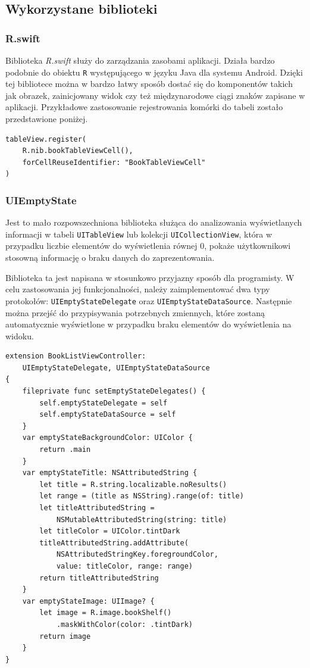 \documentclass[twoside]{projektInzynierskiMS}
\begin{document}
\subsection{Wykorzystane biblioteki}

\subsubsection{R.swift}

Biblioteka \textit{R.swift} służy do zarządzania zasobami aplikacji. Działa bardzo podobnie do obiektu \verb`R` występującego w języku Java dla systemu Android. Dzięki tej bibliotece można w bardzo łatwy sposób dostać się do komponentów takich jak obrazek, zainicjowany widok czy też międzynarodowe ciągi znaków zapisane w aplikacji. Przykładowe zastosowanie rejestrowania komórki do tabeli zostało przedstawione poniżej.
\begin{verbatim}
tableView.register(
    R.nib.bookTableViewCell(),
    forCellReuseIdentifier: "BookTableViewCell"
)
\end{verbatim}


\subsubsection{UIEmptyState}

Jest to mało rozpowszechniona biblioteka służąca do analizowania wyświetlanych informacji w tabeli \verb`UITableView` lub kolekcji \verb`UICollectionView`, która w przypadku liczbie elementów do wyświetlenia równej 0, pokaże użytkownikowi stosowną informację o braku danych do zaprezentowania.

Biblioteka ta jest napisana w stosunkowo przyjazny sposób dla programisty. W celu zastosowania jej funkcjonalności, należy zaimplementować dwa typy protokołów: \verb`UIEmptyStateDelegate` oraz \verb`UIEmptyStateDataSource`. Następnie można przejść do przypisywania potrzebnych zmiennych, które zostaną automatycznie wyświetlone w przypadku braku elementów do wyświetlenia na widoku.
\begin{verbatim}
extension BookListViewController:
    UIEmptyStateDelegate, UIEmptyStateDataSource
{
    fileprivate func setEmptyStateDelegates() {
        self.emptyStateDelegate = self
        self.emptyStateDataSource = self
    }
    var emptyStateBackgroundColor: UIColor {
        return .main
    }
    var emptyStateTitle: NSAttributedString {
        let title = R.string.localizable.noResults()
        let range = (title as NSString).range(of: title)
        let titleAttributedString =
            NSMutableAttributedString(string: title)
        let titleColor = UIColor.tintDark
        titleAttributedString.addAttribute(
            NSAttributedStringKey.foregroundColor,
            value: titleColor, range: range)
        return titleAttributedString
    }
    var emptyStateImage: UIImage? {
        let image = R.image.bookShelf()
            .maskWithColor(color: .tintDark)
        return image
    }
}
\end{verbatim}
\end{document}

